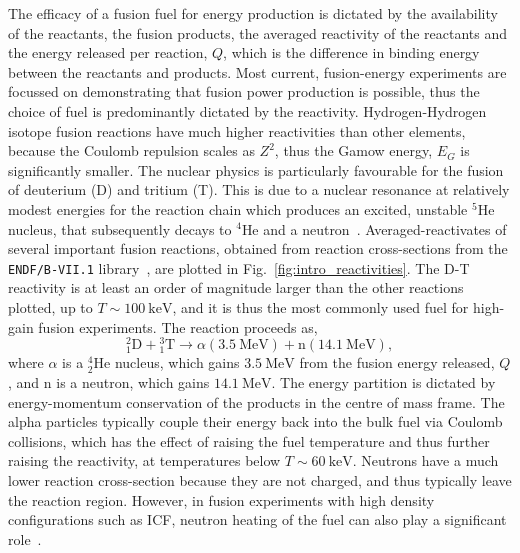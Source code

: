 The efficacy of a fusion fuel for energy production is dictated by the availability of the reactants, the fusion products, the averaged reactivity of the reactants and the energy released per reaction, $Q$, which is the difference in binding energy between the reactants and products.
Most current, fusion-energy experiments are focussed on demonstrating that fusion power production is possible, thus the choice of fuel is predominantly dictated by the reactivity.
Hydrogen-Hydrogen isotope fusion reactions have much higher reactivities than other elements, because the Coulomb repulsion scales as $Z^2$, thus the Gamow energy, $E_G$ is significantly smaller.
The nuclear physics is particularly favourable for the fusion of deuterium (D) and tritium (T).
This is due to a nuclear resonance at relatively modest energies for the reaction chain which produces an excited, unstable ${}^5 \text{He}$ nucleus, that subsequently decays to ${}^4\text{He}$ and a neutron~\cite{brown_field_2014}.
Averaged-reactivates of several important fusion reactions, obtained from reaction cross-sections from the \texttt{ENDF/B-VII.1} library~\cite{chadwick_endf_2011}, are plotted in Fig.~\ref{fig:intro_reactivities}.
The D-T reactivity is at least an order of magnitude larger than the other reactions plotted, up to $T\sim100\ \text{keV}$, and it is thus the most commonly used fuel for high-gain fusion experiments.
The reaction proceeds as,
\begin{equation}
    \label{eq:intro_DTreac}
    {}^{2}_{1}\text{D} + {}^{3}_{1}\text{T} \rightarrow \alpha(3.5\ \text{MeV}) + \text{n}(14.1\ \text{MeV}),
\end{equation}
where $\alpha$ is a ${}^{4}_{2}\text{He}$ nucleus, which gains $3.5\ \text{MeV}$ from the fusion energy released, $Q$, and $\text{n}$ is a neutron, which gains $14.1\ \text{MeV}$.
The energy partition is dictated by energy-momentum conservation of the products in the centre of mass frame.
The alpha particles typically couple their energy back into the bulk fuel via Coulomb collisions, which has the effect of raising the fuel temperature and thus further raising the reactivity, at temperatures below $T\sim60\ \text{keV}$.
Neutrons have a much lower reaction cross-section because they are not charged, and thus typically leave the reaction region.
However, in fusion experiments with high density configurations such as \ac{ICF}, neutron heating of the fuel can also play a significant role~\cite{daughton_influence_2023}.


